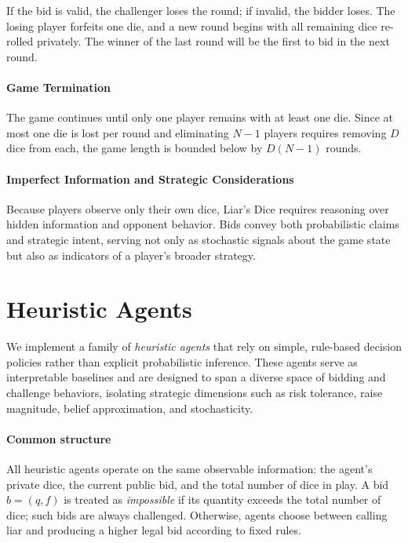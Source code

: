 If the bid is valid, the challenger loses the round; if invalid, the bidder loses. The losing player forfeits one die, and a new round begins with all remaining dice re-rolled privately. The winner of the last round will be the first to bid in the next round.

\paragraph{Game Termination}

The game continues until only one player remains with at least one die. Since at most one die is lost per round and eliminating \(N-1\) players requires removing \(D\) dice from each, the game length is bounded below by \(D (N-1)\) rounds.

\paragraph{Imperfect Information and Strategic Considerations}

Because players observe only their own dice, Liar’s Dice requires reasoning over hidden information and opponent behavior. Bids convey both probabilistic claims and strategic intent, serving not only as stochastic signals about the game state but also as indicators of a player’s broader strategy.



\section{Heuristic Agents}
\label{app:heuristic_agents}

We implement a family of \emph{heuristic agents} that rely on simple, rule-based decision policies rather than explicit probabilistic inference. These agents serve as interpretable baselines and are designed to span a diverse space of bidding and challenge behaviors, isolating strategic dimensions such as risk tolerance, raise magnitude, belief approximation, and stochasticity.

\paragraph{Common structure}
All heuristic agents operate on the same observable information: the agent’s private dice, the current public bid, and the total number of dice in play. A bid \( b = (q,f) \) is treated as \emph{impossible} if its quantity exceeds the total number of dice; such bids are always challenged. Otherwise, agents choose between calling liar and producing a higher legal bid according to fixed rules.

